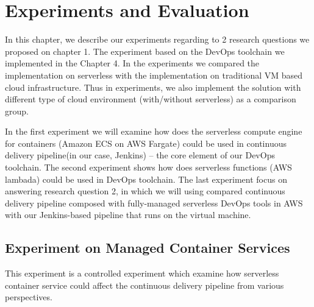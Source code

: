 \chapter{Experiments and Evaluation}
In this chapter, we describe our experiments regarding to 2 research questions we proposed on chapter 1. The experiment based on the DevOps toolchain we implemented in the Chapter 4. In the experiments we compared the implementation on serverless with the implementation on traditional VM based cloud infrastructure. Thus in experiments, we also implement the solution with different type of cloud environment (with/without serverless) as a comparison group.
\par
In the first experiment we will examine how does the serverless compute engine for containers (Amazon ECS on AWS Fargate) could be used in continuous delivery pipeline(in our case, Jenkins) -- the core element of our DevOps toolchain. The second experiment shows how does serverless functions (AWS lambada) could be used in DevOps toolchain. The last experiment focus on answering research question 2, in which we will using compared continuous delivery pipeline composed with fully-managed serverless DevOps tools in AWS with our Jenkins-based pipeline that runs on the virtual machine.
\section{Experiment on Managed Container Services}
This experiment is a controlled experiment which examine how serverless container service could affect the continuous delivery pipeline from various perspectives.
